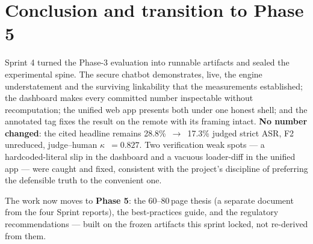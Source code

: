 \documentclass[11pt,a4paper]{article}
\newcommand{\kpa}{\ensuremath{\kappa}}
\begin{document}
\section{Conclusion and transition to Phase 5}

Sprint 4 turned the Phase-3 evaluation into runnable artifacts and sealed the experimental spine. The
secure chatbot demonstrates, live, the engine understatement and the surviving linkability that the
measurements established; the dashboard makes every committed number inspectable without recomputation;
the unified web app presents both under one honest shell; and the annotated tag fixes the result on the
remote with its framing intact. \textbf{No number changed}: the cited headline remains 28.8\%~$\to$~17.3\%
judged strict ASR, F2 unreduced, judge--human \kpa{}~$=0.827$. Two verification weak spots --- a
hardcoded-literal slip in the dashboard and a vacuous loader-diff in the unified app --- were caught and
fixed, consistent with the project's discipline of preferring the defensible truth to the convenient one.

\noindent The work now moves to \textbf{Phase 5}: the 60--80\,page thesis (a separate document from the
four Sprint reports), the best-practices guide, and the regulatory recommendations --- built on the
frozen artifacts this sprint locked, not re-derived from them.
\end{document}
